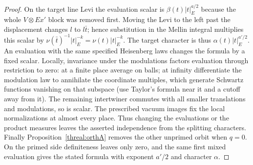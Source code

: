 \begin{proof}
On the target line Levi the evaluation scalar is
\(\beta(t)|t|_E^{a/2}\) because the whole \(V\otimes Ex'\)
block was removed first. Moving the Levi to the left past the
displacement changes \(l\) to \(l\bar t\); hence substitution in
the Mellin integral multiplies this scalar by
\(\nu(\bar t)^{-1}|t|_E^{-k}=\nu(t)|t|_E^{-k}\).
The target character is thus \(\alpha(t)|t|_E^{a'/2}\).
An evaluation with the same specified Heisenberg laws changes the
formula by a fixed scalar. Locally, invariance under the modulations
factors evaluation through restriction to zero: at a finite place
average on balls; at infinity differentiate the modulation law
to annihilate the coordinate multiples, which generate Schwartz
functions vanishing on that subspace (use Taylor's formula near it
and a cutoff away from it). The remaining intertwiner commutes with
all smaller translations and modulations, so is scalar. The
prescribed vacuum images fix the local normalizations at almost
every place. Thus changing the evaluations or the product measures
leaves the asserted independence from the splitting characters.
Finally Proposition~\ref{threal:orthA} removes the other unprimed
orbit when \(q=0\). On the primed side definiteness leaves only
zero, and the same first mixed evaluation gives the stated formula
with exponent \(a'/2\) and character \(\alpha\).
\end{proof}


